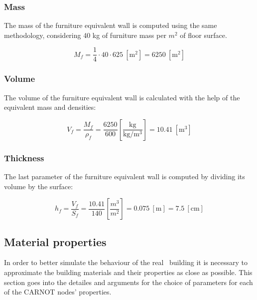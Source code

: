 \subsubsection*{Mass}

The mass of the furniture equivalent wall is computed using the same
methodology, considering 40 kg of furniture mass per $m^2$ of floor surface.

\begin{equation}
    M_f = \frac{1}{4} \cdot 40 \cdot 625\ \left[\text{m}^2\right] = 6250\
    \left[\text{m}^2\right]
\end{equation}

\subsubsection*{Volume}

The volume of the furniture equivalent wall is calculated with the help of the
equivalent mass and densities:

\begin{equation}
    V_f = \frac{M_f}{\rho_f} = \frac{6250}{600}
    \left[\frac{\text{kg}}{\text{kg}/\text{m}^3}\right]
    = 10.41\ \left[\text{m}^3\right]
\end{equation}

\subsubsection*{Thickness}

The last parameter of the furniture equivalent wall is computed by dividing its
volume by the surface:

\begin{equation}
    h_f = \frac{V_f}{S_f} = \frac{10.41}{140} \left[\frac{m^3}{m^2}\right] =
    0.075\ \left[\text{m}\right] = 7.5\ \left[\text{cm}\right]
\end{equation}


\subsection{Material properties}

In order to better simulate the behaviour of the real \pdome\ building it is
necessary to approximate the building materials and their properties as close as
possible. This section goes into the detailes and arguments for the choice of
parameters for each of the CARNOT nodes' properties.

